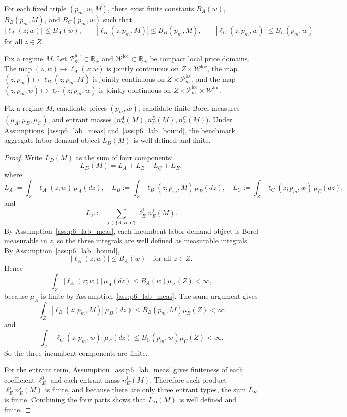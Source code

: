 \begin{assumption}
\label{ass:p6_lab_bound}
For each fixed triple $(p_m,w,M)$, there exist finite constants $B_A(w)$, $B_B(p_m,M)$, and $B_C(p_m,w)$ such that
\[
|\ell_A(z;w)|\le B_A(w),\qquad
|\ell_B(z;p_m,M)|\le B_B(p_m,M),\qquad
|\ell_C(z;p_m,w)|\le B_C(p_m,w)
\]
for all $z\in Z$.
\end{assumption}

\begin{assumption}
\label{ass:p6_lab_cont}
Fix a regime $M$. Let $\mathcal P_m^{\mathrm{loc}}\subset\mathbb R_+$ and $\mathcal W^{\mathrm{loc}}\subset\mathbb R_+$ be compact local price domains. The map $(z,w)\mapsto \ell_A(z;w)$ is jointly continuous on $Z\times\mathcal W^{\mathrm{loc}}$, the map $(z,p_m)\mapsto \ell_B(z;p_m,M)$ is jointly continuous on $Z\times\mathcal P_m^{\mathrm{loc}}$, and the map $(z,p_m,w)\mapsto \ell_C(z;p_m,w)$ is jointly continuous on $Z\times\mathcal P_m^{\mathrm{loc}}\times\mathcal W^{\mathrm{loc}}$.
\end{assumption}

\begin{proposition}
Fix a regime $M$, candidate prices $(p_m,w)$, candidate finite Borel measures $(\mu_A,\mu_B,\mu_C)$, and entrant masses $\bigl(n_E^A(M),n_E^B(M),n_E^C(M)\bigr)$. Under Assumptions~\ref{ass:p6_lab_meas} and~\ref{ass:p6_lab_bound}, the benchmark aggregate labor-demand object $L_D(M)$ is well defined and finite.
\end{proposition}

\begin{proof}
Write $L_D(M)$ as the sum of four components:
\[
L_D(M)=L_A+L_B+L_C+L_E,
\]
where
\[
L_A:=\int_Z \ell_A(z;w)\,\mu_A(dz),\quad
L_B:=\int_Z \ell_B(z;p_m,M)\,\mu_B(dz),\quad
L_C:=\int_Z \ell_C(z;p_m,w)\,\mu_C(dz),
\]
and
\[
L_E:=\sum_{j\in\{A,B,C\}}\ell_E^j n_E^j(M).
\]
By Assumption~\ref{ass:p6_lab_meas}, each incumbent labor-demand object is Borel measurable in $z$, so the three integrals are well defined as measurable integrals. By Assumption~\ref{ass:p6_lab_bound},
\[
|\ell_A(z;w)|\le B_A(w)\quad\text{for all } z\in Z.
\]
Hence
\[
\int_Z |\ell_A(z;w)|\,\mu_A(dz)\le B_A(w)\mu_A(Z)<\infty,
\]
because $\mu_A$ is finite by Assumption~\ref{ass:p6_lab_meas}. The same argument gives
\[
\int_Z |\ell_B(z;p_m,M)|\,\mu_B(dz)\le B_B(p_m,M)\mu_B(Z)<\infty
\]
and
\[
\int_Z |\ell_C(z;p_m,w)|\,\mu_C(dz)\le B_C(p_m,w)\mu_C(Z)<\infty.
\]
So the three incumbent components are finite.

For the entrant term, Assumption~\ref{ass:p6_lab_meas} gives finiteness of each coefficient $\ell_E^j$ and each entrant mass $n_E^j(M)$. Therefore each product $\ell_E^j n_E^j(M)$ is finite, and because there are only three entrant types, the sum $L_E$ is finite. Combining the four parts shows that $L_D(M)$ is well defined and finite.
\end{proof}

